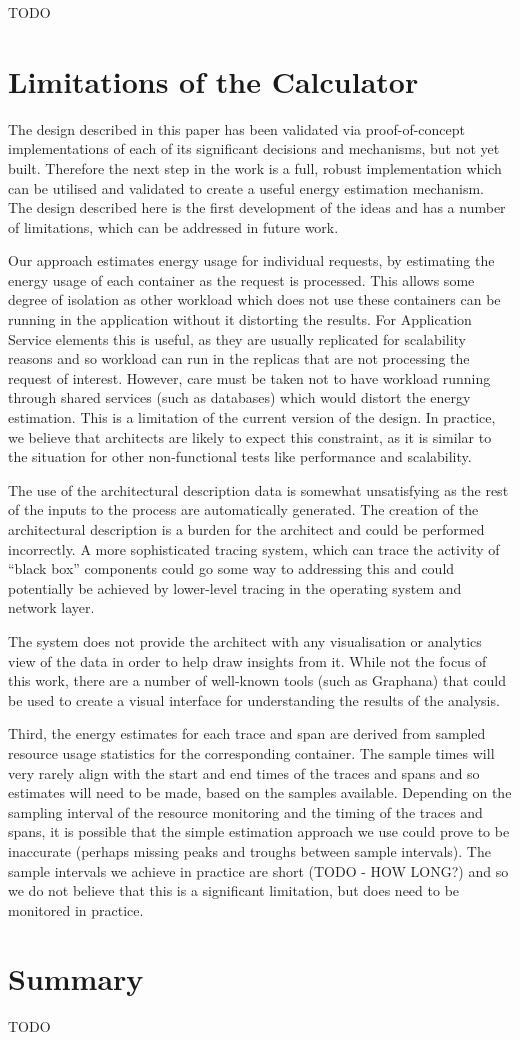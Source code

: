 TODO

\section{Limitations of the Calculator}

The design described in this paper has been validated via proof-of-concept implementations of each of its significant decisions and mechanisms, but not yet built.  Therefore the next step in the work is a full, robust implementation which can be utilised and validated to create a useful energy estimation mechanism.
The design described here is the first development of the ideas and has a number of limitations, which can be addressed in future work.

Our approach estimates energy usage for individual requests, by estimating the energy usage of each container as the request is processed.  This allows some degree of isolation as other workload which does not use these containers can be running in the application without it distorting the results.  For Application Service elements this is useful, as they are usually replicated for scalability reasons and so workload can run in the replicas that are not processing the request of interest.  However, care must be taken not to have workload running through shared services (such as databases) which would distort the energy estimation.  This is a limitation of the current version of the design. In practice, we believe that architects are likely to expect this constraint, as it is similar to the situation for other non-functional tests like performance and scalability.

The use of the architectural description data is somewhat unsatisfying as the rest of the inputs to the process are automatically generated.  The creation of the architectural description is a burden for the architect and could be performed incorrectly.  A more sophisticated tracing system, which can trace the activity of “black box” components could go some way to addressing this and could potentially be achieved by lower-level tracing in the operating system and network layer.

The system does not provide the architect with any visualisation or analytics view of the data in order to help draw insights from it.  While not the focus of this work, there are a number of well-known tools (such as Graphana) that could be used to create a visual interface for understanding the results of the analysis.

Third, the energy estimates for each trace and span are derived from sampled resource usage statistics for the corresponding container.  The sample times will very rarely align with the start and end times of the traces and spans and so estimates will need to be made, based on the samples available.  Depending on the sampling interval of the resource monitoring and the timing of the traces and spans, it is possible that the simple estimation approach we use could prove to be inaccurate (perhaps missing peaks and troughs between sample intervals).  The sample intervals we achieve in practice are short (TODO - HOW LONG?) and so we do not believe that this is a significant limitation, but does need to be monitored in practice.

\section{Summary}

TODO


